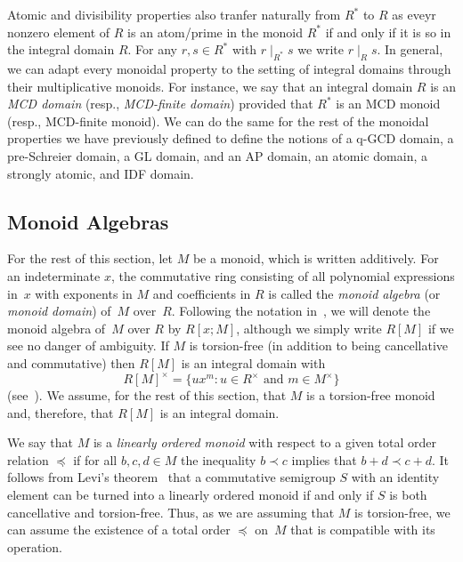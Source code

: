 \documentclass[10pt]{amsart}
\theoremstyle{definition}
\theoremstyle{remark}
\numberwithin{equation}{section}
\begin{document}
Atomic and divisibility properties also tranfer naturally from $R^*$ to $R$ as eveyr nonzero element of $R$ is an atom/prime in the monoid $R^*$ if and only if it is so in the integral domain $R$. For any $r,s \in R^*$ with $r \mid_{R^*} s$ we write $r \mid_R s$. In general, we can adapt every monoidal property to the setting of integral domains through their multiplicative monoids. For instance, we say that an integral domain $R$ is an \emph{MCD domain} (resp., \emph{MCD-finite domain}) provided that $R^*$ is an MCD monoid (resp., MCD-finite monoid). We can do the same for the rest of the monoidal properties we have previously defined to define the notions of a q-GCD domain, a pre-Schreier domain, a GL domain, and an AP domain, an atomic domain, a strongly atomic, and IDF domain.



\medskip
\subsection{Monoid Algebras} 

For the rest of this section, let $M$ be a monoid, which is written additively. For an indeterminate $x$, the commutative ring consisting of all polynomial expressions in~$x$ with exponents in $M$ and coefficients in $R$ is called the \emph{monoid algebra} (or \emph{monoid domain}) of~$M$ over~$R$. Following the notation in~\cite{rG84}, we will denote the monoid algebra of~$M$ over $R$ by $R[x;M]$, although we simply write $R[M]$ if we see no danger of ambiguity. If $M$ is torsion-free (in addition to being cancellative and commutative) then $R[M]$ is an integral domain with
\[
  R[M]^\times = \{ux^m : u \in R^\times \text{ and } m \in M^\times \}
\]
(see~\cite[Theorems~8.1 and 11.1]{rG84}). We assume, for the rest of this section, that $M$ is a torsion-free monoid and, therefore, that $R[M]$ is an integral domain. 
\smallskip

We say that $M$ is a \emph{linearly ordered monoid} with respect to a given total order relation $\preceq$ if for all $b,c,d \in M$ the inequality $b \prec c$ implies that $b+d \prec c+d$. It follows from Levi's theorem~\cite{fL13} that a commutative semigroup $S$ with an identity element can be turned into a linearly ordered monoid if and only if $S$ is both cancellative and torsion-free. Thus, as we are assuming that $M$ is torsion-free, we can assume the existence of a total order $\preceq$ on~$M$ that is compatible with its operation.
\smallskip
\end{document}
